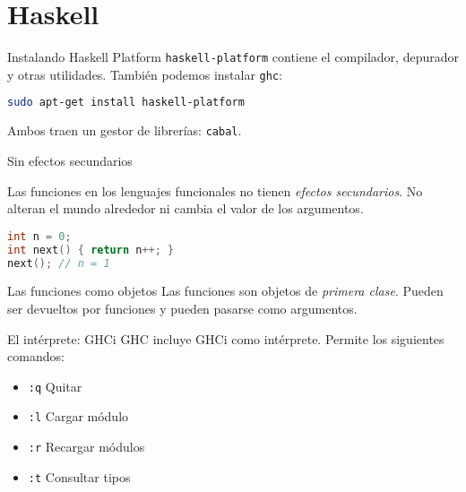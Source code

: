 \section{Haskell}

\begin{frame}[fragile]{Instalando Haskell Platform}
  \texttt{haskell-platform} contiene el compilador, depurador y otras utilidades.
  También podemos instalar \texttt{ghc}:
  \espacio
  \begin{lstlisting}[language=bash]
sudo apt-get install haskell-platform
  \end{lstlisting}
  \espacio
  Ambos traen un gestor de librerías: \texttt{cabal}.
\end{frame}

\begin{frame}[fragile]{Sin efectos secundarios}

    Las funciones en los lenguajes funcionales no tienen \textit{efectos secundarios}.
    No alteran el mundo alrededor ni cambia el valor de los argumentos.
    \espacio
  \begin{lstlisting}[language=C++]
int n = 0;
int next() { return n++; }
next(); // n = 1
  \end{lstlisting}

\end{frame}

\begin{frame}[fragile]{Las funciones como objetos}
 Las funciones son objetos de \textit{primera clase}. Pueden ser devueltos
 por funciones y pueden pasarse como argumentos.


\end{frame}

\begin{frame}{El intérprete: GHCi}
  GHC incluye GHCi como intérprete. Permite los siguientes comandos:
  \espacio
  \begin{itemize}
    \item \texttt{:q} \qquad  Quitar
    \item \texttt{:l} \qquad  Cargar módulo
    \item \texttt{:r} \qquad  Recargar módulos
    \item \texttt{:t} \qquad  Consultar tipos
  \end{itemize}

\end{frame}

